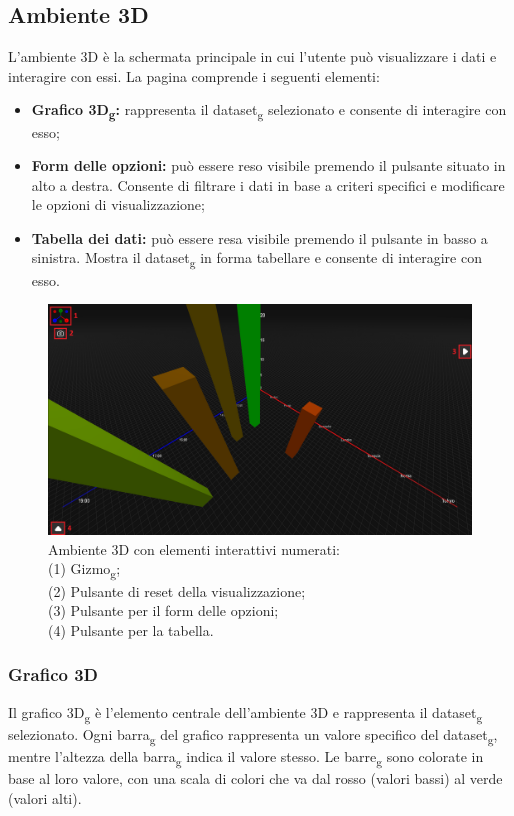 \subsection{Ambiente 3D}
L'ambiente 3D è la schermata principale in cui l'utente può visualizzare i dati
e interagire con essi. La pagina comprende i seguenti elementi:
\begin{itemize}
    \item \textbf{Grafico 3D\textsubscript{g}:} rappresenta il dataset\textsubscript{g} selezionato e consente di
          interagire con esso;
    \item \textbf{Form delle opzioni:} può essere reso visibile premendo
          il pulsante situato in alto a destra. Consente di filtrare i dati in
          base a criteri specifici e modificare le opzioni di visualizzazione;
    \item \textbf{Tabella dei dati:} può essere resa visibile premendo il
          pulsante in basso a sinistra. Mostra il dataset\textsubscript{g} in forma tabellare e
          consente di interagire con esso.
\end{itemize}
\begin{figure}[ht!]
    \centering
    \includegraphics[scale=0.29]{template/images/envpage.png}
    \caption{
        Ambiente 3D con elementi interattivi numerati:\\
        (1) Gizmo\textsubscript{g};\\
        (2) Pulsante di reset della visualizzazione;\\
        (3) Pulsante per il form delle opzioni;\\
        (4) Pulsante per la tabella.
    }
\end{figure}
\subsubsection{Grafico 3D}
Il grafico 3D\textsubscript{g} è l'elemento centrale dell'ambiente 3D e rappresenta il dataset\textsubscript{g}
selezionato. Ogni barra\textsubscript{g} del grafico rappresenta un valore specifico del
dataset\textsubscript{g}, mentre l'altezza della barra\textsubscript{g} indica il valore stesso. Le barre\textsubscript{g} sono
colorate in base al loro valore, con una scala di colori che va dal rosso
(valori bassi) al verde (valori alti).

